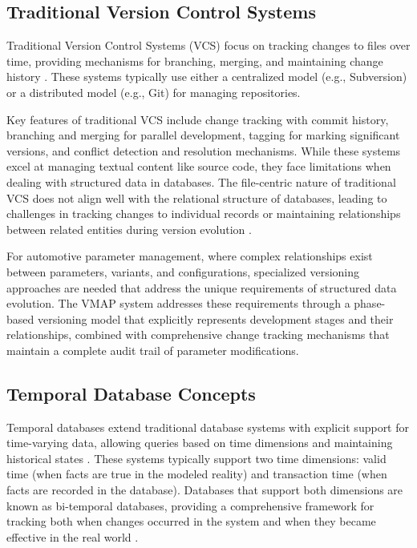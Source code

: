 \subsection{Traditional Version Control Systems}
\label{subsec:traditional-version-control}

Traditional Version Control Systems (VCS) focus on tracking changes to files over time, providing mechanisms for branching, merging, and maintaining change history \cite{tichy1985rcs}. These systems typically use either a centralized model (e.g., Subversion) or a distributed model (e.g., Git) for managing repositories.

Key features of traditional VCS include change tracking with commit history, branching and merging for parallel development, tagging for marking significant versions, and conflict detection and resolution mechanisms. While these systems excel at managing textual content like source code, they face limitations when dealing with structured data in databases. The file-centric nature of traditional VCS does not align well with the relational structure of databases, leading to challenges in tracking changes to individual records or maintaining relationships between related entities during version evolution \cite{bhattacherjee2015principles}.

For automotive parameter management, where complex relationships exist between parameters, variants, and configurations, specialized versioning approaches are needed that address the unique requirements of structured data evolution. The VMAP system addresses these requirements through a phase-based versioning model that explicitly represents development stages and their relationships, combined with comprehensive change tracking mechanisms that maintain a complete audit trail of parameter modifications.

\subsection{Temporal Database Concepts}
\label{subsec:temporal-database-concepts}

Temporal databases extend traditional database systems with explicit support for time-varying data, allowing queries based on time dimensions and maintaining historical states \cite{kulkarni2012temporal}. These systems typically support two time dimensions: valid time (when facts are true in the modeled reality) and transaction time (when facts are recorded in the database). Databases that support both dimensions are known as bi-temporal databases, providing a comprehensive framework for tracking both when changes occurred in the system and when they became effective in the real world \cite{bohlen2018database}.

